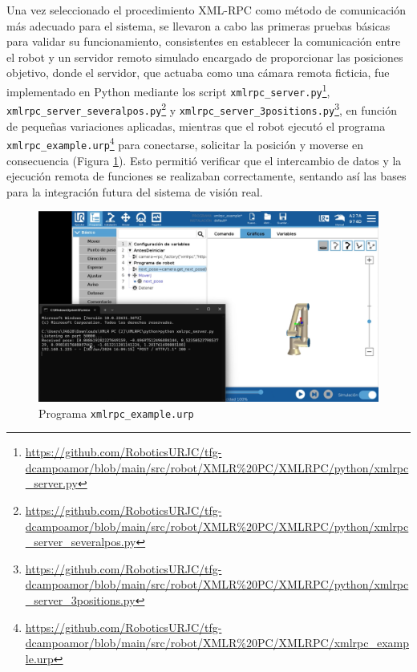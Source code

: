 Una vez seleccionado el procedimiento XML-RPC como método de comunicación más adecuado para el sistema, se llevaron a cabo las primeras pruebas básicas para validar su funcionamiento, consistentes en establecer la comunicación entre el robot y un servidor remoto simulado encargado de proporcionar las posiciones objetivo, donde el servidor, que actuaba como una cámara remota ficticia, fue implementado en Python mediante los script \verb|xmlrpc_server.py|\footnote{\url{https://github.com/RoboticsURJC/tfg-dcampoamor/blob/main/src/robot/XMLR\%20PC/XMLRPC/python/xmlrpc_server.py}}, \verb|xmlrpc_server_severalpos.py|\footnote{\url{https://github.com/RoboticsURJC/tfg-dcampoamor/blob/main/src/robot/XMLR\%20PC/XMLRPC/python/xmlrpc_server_severalpos.py}} y \verb|xmlrpc_server_3positions.py|\footnote{\url{https://github.com/RoboticsURJC/tfg-dcampoamor/blob/main/src/robot/XMLR\%20PC/XMLRPC/python/xmlrpc_server_3positions.py}}, en función de pequeñas variaciones aplicadas, mientras que el robot ejecutó el programa \verb|xmlrpc_example.urp|\footnote{\url{https://github.com/RoboticsURJC/tfg-dcampoamor/blob/main/src/robot/XMLR\%20PC/XMLRPC/xmlrpc_example.urp}} para conectarse, solicitar la posición y moverse en consecuencia (Figura \ref{fig:prueba_xmlrpc}). Esto permitió verificar que el intercambio de datos y la ejecución remota de funciones se realizaban correctamente, sentando así las bases para la integración futura del sistema de visión real.

  \begin{figure}[H]
     \centering
     \begin{center}
       \includegraphics[width=155mm]{figs/xmlrpc_example.png}
     \end{center}
     \caption{Programa \texttt{xmlrpc\_example.urp}}
     \label{fig:prueba_xmlrpc}
  \end{figure}

